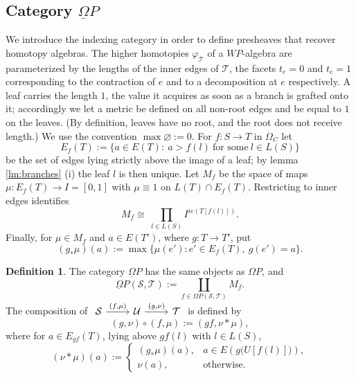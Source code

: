 \documentclass{amsart}
\theoremstyle{definition}
\newtheorem{definition}[formula]{Definition}
\theoremstyle{remark}
\newcommand{\lb}{\lbrace}
\newcommand{\rb}{\rbrace}
\begin{document}
	\subsection{Category $\underline{\Omega} P$}\label{ssec:resop}
	
	We introduce the indexing category in order to define presheaves that recover
	homotopy algebras. 
	The higher homotopies $\varphi_{\mathcal{T}}$ of a $WP$-algebra are parameterized by the lengths of the inner edges of $\mathcal{T}$, the facets $t_e=0$ and $t_e=1$
	corresponding to the contraction of $e$ and to a decomposition at $e$ respectively.
	A leaf carries the length $1$, the value it acquires as soon as a branch is grafted onto it;
	accordingly we let a metric be defined on all non-root edges and be equal to $1$ on the leaves.
	(By definition, leaves have no root, and the root does not receive length.)
	We use the convention
	$\max\varnothing:=0$.
	For $f\colon S\to T$ in $\Omega_{C}$ let
	\[
		E_f(T):=\{a\in E(T)\colon \ a>f(l)\ \text{for some}\ l\in L(S)\}
	\]
	be the set of edges lying strictly above the image of a leaf; by lemma \ref{lm:branches} (i) the leaf
	$l$ is then unique. Let $M_f$ be the space of maps $\mu\colon E_f(T)\to I=[0,1]$ with $\mu\equiv 1$ on
	$L(T)\cap E_f(T)$. Restricting to inner edges identifies
	\[
		M_f\cong\ 
		\prod_{l\in L(S)} I^{ie(T[f(l)])}.
	\]
	Finally, for $\mu\in M_f$ and $a\in E(T')$, where $g\colon T\to T'$, put
	\[
		(g_*\mu)(a):=\max\bigl\lb\mu(e')\colon 	e'\in E_f(T),\ g(e')=a\bigr\rb.
	\]
	
	\begin{definition}\label{def:thick}
		The category $\underline{\Omega} P$ has the same objects as $\Omega P$, and
		\[
			 \underline{\Omega}P(\mathcal{S},\mathcal{T}) := \coprod_{f\in\Omega P(\mathcal{S},\mathcal{T})} M_{f}.
		\]
		The composition of 
		$
		\begin{tikzcd}
		\mathcal{S} \arrow{r}{(f,\mu)} &
		\mathcal{U} \arrow{r}{(g,\nu)} &
		\mathcal{T}
		\end{tikzcd}
		$ is defined by
		\[
			(g,\nu)\circ(f,\mu):=(gf,\nu*\mu),
		\]
		where for $a\in E_{gf}(T)$, lying above $gf(l)$ with
		$l\in L(S)$, 
		\begin{equation}\label{eq:comp}
			(\nu*\mu)(a):=
			\begin{cases}
				(g_*\mu)(a), & a\in E(g\bigl(U[f(l)]\bigr)),\\
				\nu(a), & \text{otherwise.}
			\end{cases}
		\end{equation}
	\end{definition}
	
\end{document}
